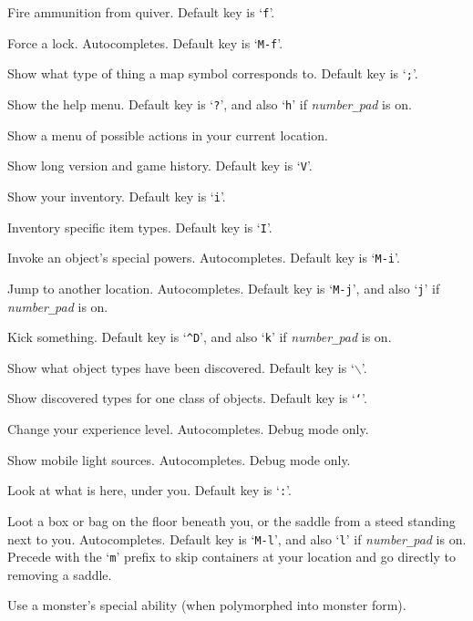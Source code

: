 Fire ammunition from quiver. Default key is `{\tt f}'.
\item[\tb{\#force}]
Force a lock. Autocompletes. Default key is `{\tt M-f}'.
\item[\tb{\#glance}]
Show what type of thing a map symbol corresponds to. Default key is `{\tt ;}'.
\item[\tb{\#help}]
Show the help menu.
Default key is `{\tt ?}',
and also `{\tt h}' if {\it number\verb+_+pad\/} is on.
\item[\tb{\#herecmdmenu}]
Show a menu of possible actions in your current location.
\item[\tb{\#history}]
Show long version and game history. Default key is `{\tt V}'.
\item[\tb{\#inventory}]
Show your inventory. Default key is `{\tt i}'.
\item[\tb{\#inventtype}]
Inventory specific item types. Default key is `{\tt I}'.
\item[\tb{\#invoke}]
Invoke an object's special powers. Autocompletes. Default key is `{\tt M-i}'.
\item[\tb{\#jump}]
Jump to another location. Autocompletes.
Default key is `{\tt M-j}',
and also `{\tt j}' if {\it number\verb+_+pad\/} is on.
\item[\tb{\#kick}]
Kick something.
Default key is `{\tt \^{}D}',
and also `{\tt k}' if {\it number\verb+_+pad\/} is on.
\item[\tb{\#known}]
Show what object types have been discovered.
Default key is `{\tt $\backslash$}'.
\item[\tb{\#knownclass}]
Show discovered types for one class of objects.
Default key is `{\tt `}'.
\item[\tb{\#levelchange}]
Change your experience level.
Autocompletes.
Debug mode only.
\item[\tb{\#lightsources}]
Show mobile light sources.
Autocompletes.
Debug mode only.
\item[\tb{\#look}]
Look at what is here, under you. Default key is `{\tt :}'.
\item[\tb{\#loot}]
Loot a box or bag on the floor beneath you, or the saddle
from a steed standing next to you. Autocompletes.
Default key is `{\tt M-l}',
and also `{\tt l}' if {\it number\verb+_+pad\/} is on.
Precede with the `{\tt m}' prefix to skip containers at your location
and go directly to removing a saddle.
\item[\tb{\#monster}]
Use a monster's special ability (when polymorphed into monster form).
